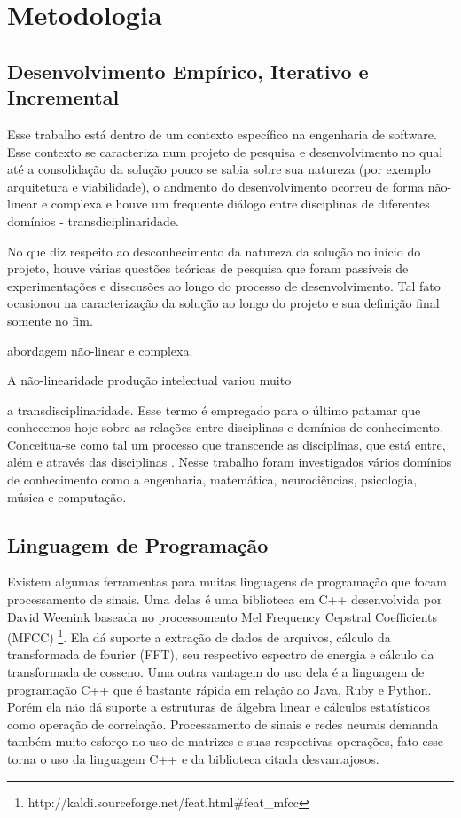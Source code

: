 \chapter{Metodologia}
\label{chap:metodologia}

\section{Desenvolvimento Empírico, Iterativo e Incremental}
\label{sec:empirico}

Esse trabalho está dentro de um contexto específico na engenharia de software. Esse contexto se caracteriza num projeto de pesquisa e desenvolvimento no qual até a consolidação da solução pouco se sabia sobre sua natureza (por exemplo arquitetura e viabilidade), o andmento do desenvolvimento ocorreu de forma não-linear e complexa e houve um frequente diálogo entre disciplinas de diferentes domínios - transdiciplinaridade.

No que diz respeito ao desconhecimento da natureza da solução no início do projeto, houve várias questões teóricas de pesquisa que foram passíveis de experimentações e disscusões ao longo do processo de desenvolvimento. Tal fato ocasionou na caracterização da solução ao longo do projeto e sua definição final somente no fim.





abordagem não-linear e complexa.

A não-linearidade   produção intelectual variou muito


a transdisciplinaridade. Esse termo é empregado para o último patamar que conhecemos hoje sobre as relações entre disciplinas e domínios de conhecimento. Conceitua-se como tal um processo que transcende as disciplinas, que está entre, além e através das disciplinas \cite{criatividade}. Nesse trabalho foram investigados vários domínios de conhecimento como a engenharia, matemática, neurociências, psicologia, música e computação.




\section{Linguagem de Programação}
\label{sec:linguagemprogramacao}

Existem algumas ferramentas para muitas linguagens de programação que focam processamento de sinais. Uma delas é uma biblioteca em C++ desenvolvida por David Weenink baseada no processomento Mel Frequency Cepstral Coefficients (MFCC) \footnote{http://kaldi.sourceforge.net/feat.html\#feat\_mfcc}. Ela dá suporte a extração de dados de arquivos, cálculo da transformada de fourier (FFT), seu respectivo espectro de energia e cálculo da transformada de cosseno. Uma outra vantagem do uso dela é a linguagem de programação C++ que é bastante rápida em relação ao Java, Ruby e Python. Porém ela não dá suporte a estruturas de álgebra linear e cálculos estatísticos como operação de correlação. Processamento de sinais e redes neurais demanda também muito esforço no uso de matrizes e suas respectivas operações, fato esse torna o uso da linguagem C++ e da biblioteca citada desvantajosos.

